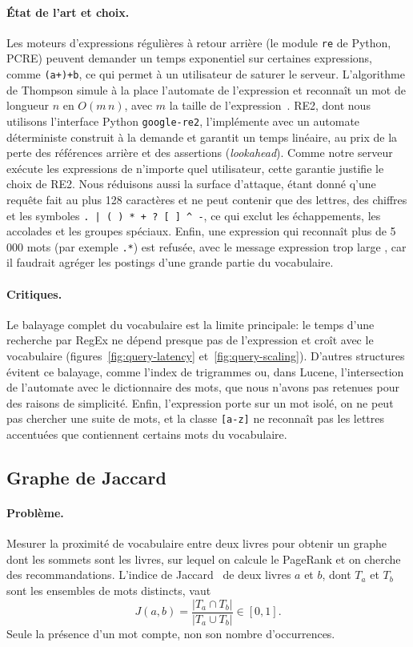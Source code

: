 \documentclass[11pt,a4paper]{article}
\begin{document}
\paragraph{État de l'art et choix.}
Les moteurs d'expressions régulières à retour arrière (le module \texttt{re} de Python, PCRE) peuvent demander un temps exponentiel sur certaines expressions, comme \texttt{(a+)+b}, ce qui permet à un utilisateur de saturer le serveur. L'algorithme de Thompson simule à la place l'automate de l'expression et reconnaît un mot de longueur $n$ en $O(m\,n)$, avec $m$ la taille de l'expression~\cite{re2}. RE2, dont nous utilisons l'interface Python \texttt{google-re2}, l'implémente avec un automate déterministe construit à la demande et garantit un temps linéaire, au prix de la perte des références arrière et des assertions (\emph{lookahead}). Comme notre serveur exécute les expressions de n'importe quel utilisateur, cette garantie justifie le choix de RE2. Nous réduisons aussi la surface d'attaque, étant donné q'une requête fait au plus 128 caractères et ne peut contenir que des lettres, des chiffres et les symboles \texttt{.\ |\ (\ )\ *\ +\ ?\ [\ ]\ \^{}\ -}, ce qui exclut les échappements, les accolades et les groupes spéciaux. Enfin, une expression qui reconnaît plus de 5\,000 mots (par exemple \texttt{.*}) est refusée, avec le message \og expression trop large \fg, car il faudrait agréger les postings d'une grande partie du vocabulaire.

\paragraph{Critiques.}
Le balayage complet du vocabulaire est la limite principale: le temps d'une recherche par RegEx ne dépend presque pas de l'expression et croît avec le vocabulaire (figures~\ref{fig:query-latency} et~\ref{fig:query-scaling}). D'autres structures évitent ce balayage, comme l'index de trigrammes ou, dans Lucene, l'intersection de l'automate avec le dictionnaire des mots, que nous n'avons pas retenues pour des raisons de simplicité. Enfin, l'expression porte sur un mot isolé, on ne peut pas chercher une suite de mots, et la classe \texttt{[a-z]} ne reconnaît pas les lettres accentuées que contiennent certains mots du vocabulaire.

\subsection{Graphe de Jaccard}

\paragraph{Problème.}
Mesurer la proximité de vocabulaire entre deux livres pour obtenir un graphe dont les sommets sont les livres, sur lequel on calcule le PageRank et on cherche des recommandations. L'indice de Jaccard~\cite{jaccard} de deux livres $a$ et $b$, dont $T_a$ et $T_b$ sont les ensembles de mots distincts, vaut
\[
    J(a,b) = \frac{|T_a \cap T_b|}{|T_a \cup T_b|} \in [0,1].
\]
Seule la présence d'un mot compte, non son nombre d'occurrences.
\end{document}
